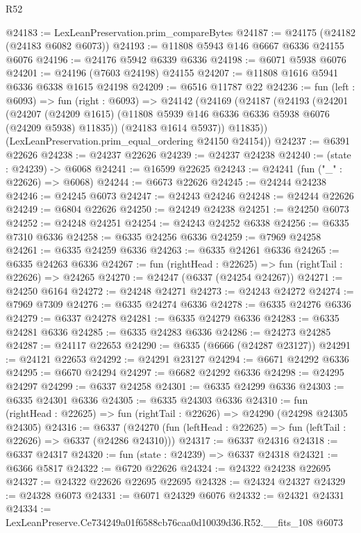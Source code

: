 \begin{lexlean}{R52}
\begin{coremodule}
@24183 := LexLeanPreservation.prim_compareBytes
@24187 := @24175 (@24182 (@24183 @6082 @6073))
@24193 := @11808 @5943 @146 @6667 @6336 @24155 @6076
@24196 := @24176 @5942 @6339 @6336
@24198 := @6071 @5938 @6076
@24201 := @24196 (@7603 @24198) @24155
@24207 := @11808 @1616 @5941 @6336 @6338 @1615 @24198
@24209 := @6516 @11787 @22
@24236 := fun (left : @6093) =>
  fun (right : @6093) =>
  @24142
    (@24169
      (@24187
        (@24193
          (@24201
            (@24207
              (@24209 @1615)
              (@11808 @5939 @146 @6336 @6336 @5938 @6076 (@24209 @5938) @11835))
            (@24183 @1614 @5937))
          @11835))
      (LexLeanPreservation.prim_equal_ordering @24150 @24154))
@24237 := @6391 @22626
@24238 := @24237 @22626
@24239 := @24237 @24238
@24240 := (state : @24239) -> @6068
@24241 := @16599 @22625
@24243 := @24241 (fun ("_" : @22626) => @6068)
@24244 := @6673 @22626
@24245 := @24244 @24238
@24246 := @24245 @6073
@24247 := @24243 @24246
@24248 := @24244 @22626
@24249 := @6804 @22626
@24250 := @24249 @24238
@24251 := @24250 @6073
@24252 := @24248 @24251
@24254 := @24243 @24252 @6338
@24256 := @6335 @7310 @6336
@24258 := @6335 @24256 @6336
@24259 := @7969 @24258
@24261 := @6335 @24259 @6336
@24263 := @6335 @24261 @6336
@24265 := @6335 @24263 @6336
@24267 := fun (rightHead : @22625) => fun (rightTail : @22626) => @24265
@24270 := @24247 (@6337 (@24254 @24267))
@24271 := @24250 @6164
@24272 := @24248 @24271
@24273 := @24243 @24272
@24274 := @7969 @7309
@24276 := @6335 @24274 @6336
@24278 := @6335 @24276 @6336
@24279 := @6337 @24278
@24281 := @6335 @24279 @6336
@24283 := @6335 @24281 @6336
@24285 := @6335 @24283 @6336
@24286 := @24273 @24285
@24287 := @24117 @22653
@24290 := @6335 (@6666 (@24287 @23127))
@24291 := @24121 @22653
@24292 := @24291 @23127
@24294 := @6671 @24292 @6336
@24295 := @6670 @24294
@24297 := @6682 @24292 @6336
@24298 := @24295 @24297
@24299 := @6337 @24258
@24301 := @6335 @24299 @6336
@24303 := @6335 @24301 @6336
@24305 := @6335 @24303 @6336
@24310 := fun (rightHead : @22625) => fun (rightTail : @22626) => @24290 (@24298 @24305 @24305)
@24316 := @6337
    (@24270 (fun (leftHead : @22625) => fun (leftTail : @22626) => @6337 (@24286 @24310)))
@24317 := @6337 @24316
@24318 := @6337 @24317
@24320 := fun (state : @24239) => @6337 @24318
@24321 := @6366 @5817
@24322 := @6720 @22626
@24324 := @24322 @24238 @22695
@24327 := @24322 @22626 @22695 @22695
@24328 := @24324 @24327
@24329 := @24328 @6073
@24331 := @6071 @24329 @6076
@24332 := @24321 @24331
@24334 := LexLeanPreserve.Ce734249a01f6588cb76caa0d10039d36.R52.__fits_108 @6073

\end{coremodule}
\end{lexlean}
